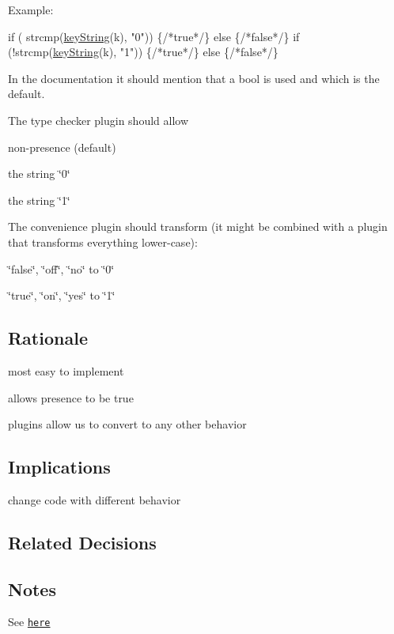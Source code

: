Example\+:


\begin{DoxyCode}
\textcolor{keywordflow}{if} ( strcmp(\hyperlink{group__keyvalue_ga880936f2481d28e6e2acbe7486a21d05}{keyString}(k), \textcolor{stringliteral}{"0"})) \{\textcolor{comment}{/*true*/}\} \textcolor{keywordflow}{else} \{\textcolor{comment}{/*false*/}\}
\textcolor{keywordflow}{if} (!strcmp(\hyperlink{group__keyvalue_ga880936f2481d28e6e2acbe7486a21d05}{keyString}(k), \textcolor{stringliteral}{"1"})) \{\textcolor{comment}{/*true*/}\} \textcolor{keywordflow}{else} \{\textcolor{comment}{/*false*/}\}
\end{DoxyCode}


In the documentation it should mention that a bool is used and which is the default.

The type checker plugin should allow


\begin{DoxyItemize}
\item non-\/presence (default)
\item the string \char`\"{}0\char`\"{}
\item the string \char`\"{}1\char`\"{}
\end{DoxyItemize}

The convenience plugin should transform (it might be combined with a plugin that transforms everything lower-\/case)\+:


\begin{DoxyItemize}
\item \char`\"{}false\char`\"{}, \char`\"{}off\char`\"{}, \char`\"{}no\char`\"{} to \char`\"{}0\char`\"{}
\item \char`\"{}true\char`\"{}, \char`\"{}on\char`\"{}, \char`\"{}yes\char`\"{} to \char`\"{}1\char`\"{}
\end{DoxyItemize}

\subsection*{Rationale}


\begin{DoxyItemize}
\item most easy to implement
\item allows presence to be true
\item plugins allow us to convert to any other behavior
\end{DoxyItemize}

\subsection*{Implications}


\begin{DoxyItemize}
\item change code with different behavior
\end{DoxyItemize}

\subsection*{Related Decisions}

\subsection*{Notes}

See \href{https://github.com/ElektraInitiative/libelektra/issues/308}{\tt here} 